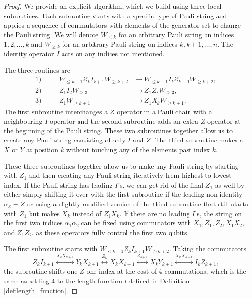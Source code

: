 \documentclass[10pt,a4paper]{amsart}
\begin{document}
\begin{proof}
We provide an explicit algorithm, which we build using three local subroutines. Each subroutine starts with a specific type of Pauli string and applies a sequence of commutators with elements of the generator set to change the Pauli string. We will denote $W_{\leq k}$ for an arbitrary Pauli string on indices $1,2,\ldots, k$ and $W_{\geq k}$ for an arbitrary Pauli string on indices $k, k+1, \ldots, n$. The identity operator $I$ acts on any indices not mentioned.

The three routines are
\begin{equation*}
\begin{aligned}
    1)&& \quad W_{\leq k-1} Z_k I_{k+1} W_{\geq k+2} &\to W_{\leq k-1} I_k Z_{k+1} W_{\geq k+2}, \\
    2)&& \quad Z_1 I_2 W_{\geq 3} & \to Z_1 Z_2 W_{\geq 3}, \\
    3) &&\quad Z_1 W_{\geq k+1} & \to Z_1 X_k W_{\geq k+1}.
\end{aligned}
\end{equation*}
The first subroutine interchanges a $Z$ operator in a Pauli chain with a neighbouring $I$ operator and the second subroutine adds an extra $Z$ operator at the beginning of the Pauli string. These two subroutines together allow us to create any Pauli string consisting of only $I$ and $Z$. The third subroutine makes a $X$ or $Y$ at position $k$ without touching any of the elements past index $k$.

These three subroutines together allow us to make any Pauli string by starting with $Z_1$ and then creating any Pauli string iteratively from highest to lowest index. If the Pauli string has leading $I$'s, we can get rid of the final $Z_1$ as well by either simply shifting it over with the first subroutine if the leading non-identity $\alpha_k = Z$ or using a slightly modified version of the third subroutine that still starts with $Z_1$ but makes $X_k$ instead of $Z_1 X_k$. If there are no leading $I$'s, the string on the first two indices $\alpha_1 \alpha_2$ can be fixed using commutators with $X_1, Z_1, Z_2, X_1 X_2,$ and $Z_1 Z_2$, as these operators fully control the first two qubits.

The first subroutine starts with $W_{\leq k-1} Z_k I_{k+1} W_{\geq k+2}$. Taking the commutators
\begin{equation}
    Z_k I_{k+1} \stackrel{X_k X_{k+1}}{\longleftrightarrow} Y_k X_{k+1} \stackrel{Z_k}{\longleftrightarrow} X_k X_{k+1} \stackrel{Z_{k+1}}{\longleftrightarrow}  X_k Y_{k+1} \stackrel{X_k X_{k+1}}{\longleftrightarrow} I_k Z_{k+1},
\end{equation}
the subroutine shifts one $Z$ one index at the cost of 4 commutations, which is the same as adding 4 to the length function $l$ defined in Definition \ref{def:length_function}.


\end{proof}
\end{document}
